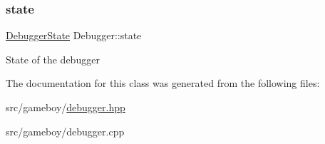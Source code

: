 \subsubsection{\texorpdfstring{state}{state}}
{\footnotesize\ttfamily \mbox{\hyperlink{structDebuggerState}{Debugger\+State}} Debugger\+::state\hspace{0.3cm}{\ttfamily [private]}}

State of the debugger 

The documentation for this class was generated from the following files\+:\begin{DoxyCompactItemize}
\item 
src/gameboy/\mbox{\hyperlink{debugger_8hpp}{debugger.\+hpp}}\item 
src/gameboy/debugger.\+cpp\end{DoxyCompactItemize}
